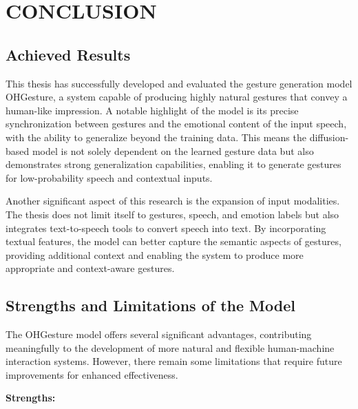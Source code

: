 \chapter{CONCLUSION}
\label{Chapter5}

\section{Achieved Results}

This thesis has successfully developed and evaluated the gesture generation model OHGesture, a system capable of producing highly natural gestures that convey a human-like impression. A notable highlight of the model is its precise synchronization between gestures and the emotional content of the input speech, with the ability to generalize beyond the training data. This means the diffusion-based model is not solely dependent on the learned gesture data but also demonstrates strong generalization capabilities, enabling it to generate gestures for low-probability speech and contextual inputs.

Another significant aspect of this research is the expansion of input modalities. The thesis does not limit itself to gestures, speech, and emotion labels but also integrates text-to-speech tools to convert speech into text. By incorporating textual features, the model can better capture the semantic aspects of gestures, providing additional context and enabling the system to produce more appropriate and context-aware gestures.

\section{Strengths and Limitations of the Model}

The OHGesture model offers several significant advantages, contributing meaningfully to the development of more natural and flexible human-machine interaction systems. However, there remain some limitations that require future improvements for enhanced effectiveness.

\vspace{10pt}

\textbf{Strengths:}


